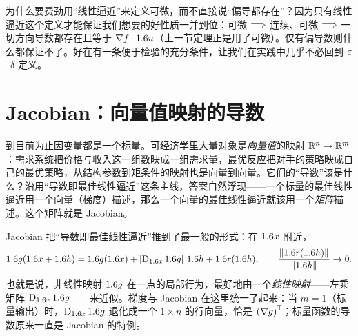 为什么要费劲用``线性逼近''来定义可微，而不直接说``偏导都存在''？因为只有线性逼近这个定义才能保证我们想要的好性质一并到位：可微 $\Longrightarrow$ 连续、可微 $\Longrightarrow$ 一切方向导数都存在且等于 $\nabla f\cdot1.6 u$（上一节定理正是用了可微）。仅有偏导数则什么都保证不了。好在有一条便于检验的充分条件，让我们在实践中几乎不必回到 $\varepsilon$–$\delta$ 定义。



\section{Jacobian：向量值映射的导数}
\label{sec:multideriv-jac}

到目前为止因变量都是一个标量。可经济学里大量对象是\emph{向量值}的映射 $\mathbb{R}^n\to\mathbb{R}^m$：需求系统把价格与收入这一组数映成一组需求量，最优反应把对手的策略映成自己的最优策略，从结构参数到矩条件的映射也是向量到向量。它们的``导数''该是什么？沿用``导数即最佳线性逼近''这条主线，答案自然浮现——一个标量的最佳线性逼近用一个向量（梯度）描述，那么一个向量的最佳线性逼近就该用一个\emph{矩阵}描述。这个矩阵就是 Jacobian。


Jacobian 把``导数即最佳线性逼近''推到了最一般的形式：在 $1.6 x$ 附近，
\[
    1.6 g(1.6 x+1.6 h)=1.6 g(1.6 x)+\left[\operatorname{D}_{1.6 x}1.6 g\right]\,1.6 h+1.6 r(1.6 h),
    \qquad
    \frac{\left\|1.6 r(1.6 h)\right\|_{}}{\left\|1.6 h\right\|_{}}\to 0 .
\]
也就是说，非线性映射 $1.6 g$ 在一点的局部行为，最好地由一个\emph{线性映射}——左乘矩阵 $\operatorname{D}_{1.6 x}1.6 g$——来近似。梯度与 Jacobian 在这里统一了起来：当 $m=1$（标量输出）时，$\operatorname{D}_{1.6 x}1.6 g$ 退化成一个 $1\times n$ 的行向量，恰是 $\left(\nabla g\right)^{\mathsf{T}}$；标量函数的导数原来一直是 Jacobian 的特例。

